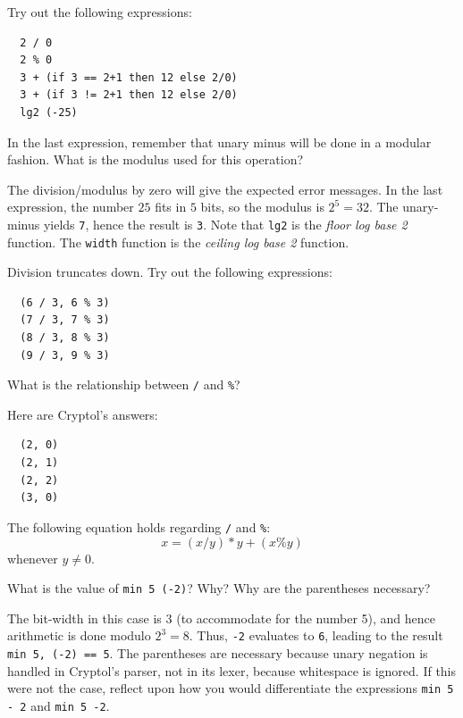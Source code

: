 \begin{Exercise}\label{ex:arith:4}
Try out the following expressions:\indEq\indNeq
\begin{Verbatim}
  2 / 0
  2 % 0
  3 + (if 3 == 2+1 then 12 else 2/0)
  3 + (if 3 != 2+1 then 12 else 2/0)
  lg2 (-25)
\end{Verbatim}
In the last expression, remember that unary minus will\indUnaryMinus
be done in a modular fashion. What is the modulus used for this
operation?
\end{Exercise}
\begin{Answer}
  The division/modulus by zero will give the expected error
  messages. In the last expression, the number $25$ fits in $5$ bits,
  so the modulus is $2^5 = 32$. The unary-minus yields {\tt 7}, hence
  the result is {\tt 3}. Note that {\tt lg2} is the \emph{floor log
    base 2} function. The {\tt width} function is the \emph{ceiling
    log base 2} function.\indLg\indEq\indNeq
\end{Answer}

\begin{Exercise}\label{ex:arith:5:1}
Division truncates down. Try out the following expressions:\indDiv\indMod
\begin{Verbatim}
  (6 / 3, 6 % 3)
  (7 / 3, 7 % 3)
  (8 / 3, 8 % 3)
  (9 / 3, 9 % 3)
\end{Verbatim}
What is the relationship between {\tt /} and {\tt \%}?
\end{Exercise}
\begin{Answer}
Here are Cryptol's answers:\indDiv\indMod
\begin{Verbatim}
  (2, 0)
  (2, 1)
  (2, 2)
  (3, 0)
\end{Verbatim}
The following equation holds regarding {\tt /} and {\tt \%}:
$$
  x = (x / y) * y + (x \% y)
$$
whenever $y \neq 0$.
\end{Answer}

\begin{Exercise}\label{ex:arith:5}
  What is the value of {\tt min 5 (-2)}?  Why?  Why are the
  parentheses necessary?\indMin\indModular\indUnaryMinus
\end{Exercise}
\begin{Answer}
  The bit-width in this case is 3 (to accommodate for the number 5),
  and hence arithmetic is done modulo $2^3 = 8$. Thus, {\tt -2}
  evaluates to {\tt 6}, leading to the result {\tt min 5, (-2) == 5}.
  The parentheses are necessary because unary negation is handled in
  Cryptol's parser, not in its lexer, because whitespace is ignored.
  If this were not the case, reflect upon how you would differentiate
  the expressions \texttt{min 5 - 2} and \texttt{min 5 -2}.
\end{Answer}

